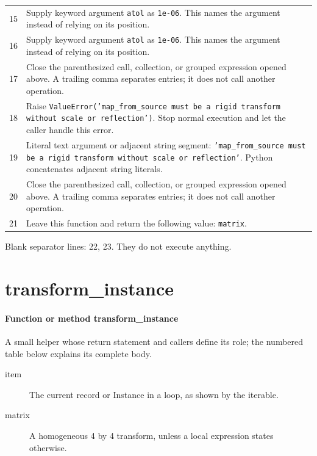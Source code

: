 \documentclass[11pt,a4paper]{book}
\begin{document}
\begin{longtable}{r p{}}
15 & Supply keyword argument \texttt{atol} as \texttt{1e-06}. This names the argument instead of relying on its position. \\

16 & Supply keyword argument \texttt{atol} as \texttt{1e-06}. This names the argument instead of relying on its position. \\

17 & Close the parenthesized call, collection, or grouped expression opened above. A trailing comma separates entries; it does not call another operation. \\

18 & Raise \texttt{ValueError('map\_from\_source must be a rigid transform without scale or reflection')}. Stop normal execution and let the caller handle this error. \\

19 & Literal text argument or adjacent string segment: \texttt{'map\_from\_source must be a rigid transform without scale or reflection'}. Python concatenates adjacent string literals. \\

20 & Close the parenthesized call, collection, or grouped expression opened above. A trailing comma separates entries; it does not call another operation. \\

21 & Leave this function and return the following value: \texttt{matrix}. \\

\end{longtable}

Blank separator lines: 22, 23. They do not execute anything.

\section{transform\_instance}

\paragraph{Function or method transform\_instance}
A small helper whose return statement and callers define its role; the numbered table below explains its complete body.

\begin{description}
\item[item] The current record or Instance in a loop, as shown by the iterable.
\item[matrix] A homogeneous 4 by 4 transform, unless a local expression states otherwise.
\end{description}
\end{document}
